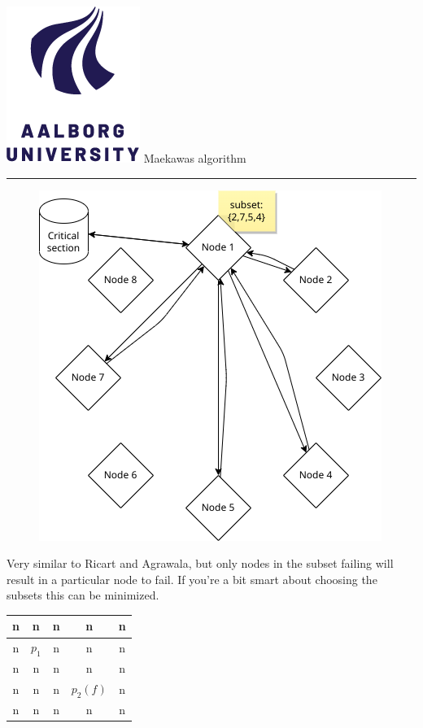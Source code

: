 \documentclass[aspectratio=1610,17pt,utf8]{beamer}
\newcommand{\regularframe}[1]{\color{black}\includegraphics[width=.05\textwidth]{figures/aau.png} #1\\\hrule}
\begin{document}
\begin{frame}{\regularframe{Maekawas algorithm}}
    \begin{minipage}{.45\textwidth}
        \begin{figure}
            \includegraphics[width=\textwidth]{figures/1-maekawa.png}
        \end{figure}
    \end{minipage}
    \begin{minipage}{.5\textwidth}
        \tiny{Very similar to Ricart and Agrawala, but only nodes in the subset failing will result in a particular node to fail. If you're a bit smart about choosing the subsets this can be minimized.}
    
        \begin{table}
            \begin{tabular}{|c|c|c|c|c|}\hline
                n & n & n & n & n \\\hline
                n & $p_1$ & n & n & n \\\hline
                n & n & n & n & n \\\hline
                n & n & n & $p_2(f)$ & n \\\hline
                n & n & n & n & n \\\hline
            \end{tabular}
        \end{table}
    
    \end{minipage}

\end{frame}
\end{document}
